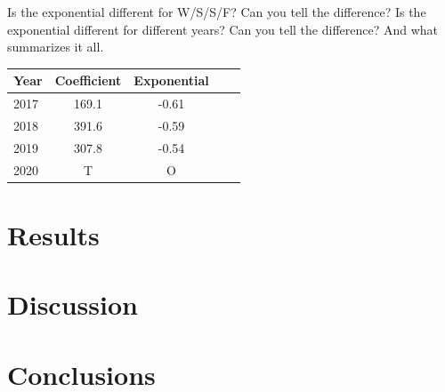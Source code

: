 \documentclass[11pt]{report}
\begin{document}
\clearpage

Is the exponential different for W/S/S/F? Can you tell the difference?
Is the exponential different for different years? Can you tell the difference?
And what summarizes it all.

\begin{tabular}{l*{3}{c}r}
	Year      & Coefficient & Exponential  \\
	\hline
	2017      & 169.1           & -0.61    \\
	2018      & 391.6           & -0.59    \\
	2019      & 307.8           & -0.54   \\
	2020      & T           & O    \\
\end{tabular}
\section{Results \label{sec:results}}


\section{Discussion \label{sec:discussion}}


\section{Conclusions \label{sec:conclusions}}


\small
\renewcommand{\bibsep}{0em}

\renewcommand{\bibname}{References}


\end{document}
